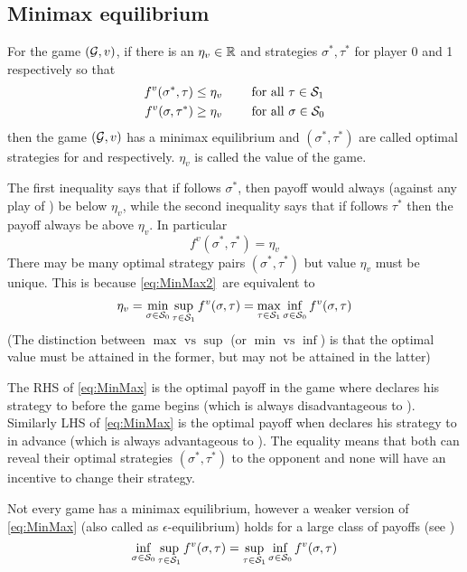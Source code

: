 \subsection{Minimax equilibrium}
For the game $(\mathcal{G},v)$, if there is an $\eta_v \in \mathbb{R}$ and strategies $\sigma^*,\tau^*$ for player 0 and 1 respectively so that
\begin{equation}
\begin{aligned}
    f^v(\sigma^*,\tau) \leq \eta_v \qquad & \text{ for all } \tau \in \mathcal{S}_1 \\
    f^v(\sigma, \tau^*)  \geq \eta_v \qquad & \text{ for all } \sigma \in \mathcal{S}_0
\end{aligned} \label{eq:MinMax2}
\end{equation}
\newcommand{\eqminmax}{\eqref{eq:MinMax2}\ }
then the game $(\mathcal{G},v)$ has a minimax equilibrium and $(\sigma^*,\tau^*)$ are called optimal strategies for  and  respectively. $\eta_v$ is called the value of the game.

The first inequality says that if  follows $\sigma^*$, then payoff would always (against any play of ) be below $\eta_v$, while the second inequality says that if  follows $\tau^*$ then the payoff always be above $\eta_v$. In particular
\[
    f^v(\sigma^*,\tau^*) = \eta_v
\]
There may be many optimal strategy pairs $(\sigma^*,\tau^*)$ but value $\eta_v$ must be unique. This is because
\eqminmax are equivalent to
\begin{align}
    \eta_v = \min_{\sigma \in \mathcal{S}_0} \sup_{\tau \in \mathcal{S}_1} f^v(\sigma, \tau) = \max_{\tau \in \mathcal{S}_1} \inf_{\sigma \in \mathcal{S}_0 } f^v(\sigma,\tau) \label{eq:MinMax}
\end{align}
(The distinction between $\max \text{ vs } \sup$ (or $\min \text{ vs } \inf$) is that the optimal value must be attained in the former, but may not be attained in the latter)

The RHS of \eqref{eq:MinMax} is the optimal payoff in the game where  declares his strategy to  before the game begins (which is always disadvantageous to ). Similarly LHS of \eqref{eq:MinMax} is the optimal payoff when  declares his strategy to  in advance (which is always advantageous to ). The equality means that both can reveal their optimal strategies $(\sigma^*,\tau^*)$ to the opponent and none will have an incentive to change their strategy.

Not every game has a minimax equilibrium, however a weaker version of \eqref{eq:MinMax} (also called as $\epsilon$-equilibrium) holds for a large class of payoffs (see  \cite{roux_equilibria})
\[
    \inf_{\sigma \in \mathcal{S}_0} \sup_{\tau \in \mathcal{S}_1} f^v(\sigma, \tau) = \sup_{\tau \in \mathcal{S}_1} \inf_{\sigma \in \mathcal{S}_0 } f^v(\sigma,\tau)
\]

